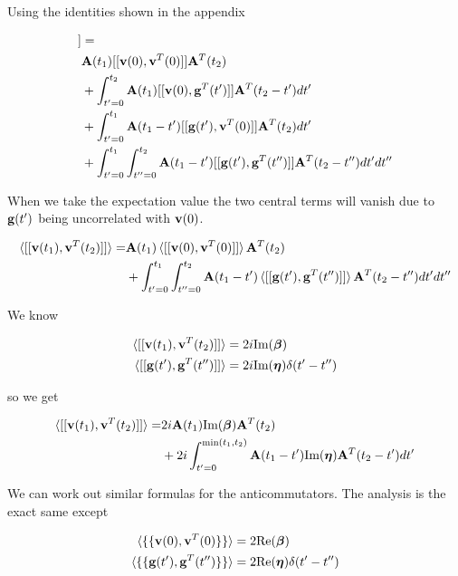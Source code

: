 \documentclass[12pt]{article}
\newcommand{\bv}[1]{\bold{#1}}
\newcommand{\bvs}[1]{\boldsymbol{#1}}
\begin{document}
Using the identities shown in the appendix

\begin{align}
[[\bv{v}(t_1),\bv{v}^T(t_2)]]&= \\
&\bv{A}(t_1)[[\bv{v}(0),\bv{v}^T(0)]]\bv{A}^T(t_2)\\
&+\int_{t'=0}^{t_2} \bv{A}(t_1) [[\bv{v}(0),\bv{g}^T(t')]] \bv{A}^T(t_2-t') dt'\\
&+\int_{t'=0}^{t_1}\bv{A}(t_1-t')[[\bv{g}(t'),\bv{v}^T(0)]] \bv{A}^T(t_2) dt'\\
&+\int_{t'=0}^{t_1}\int_{t''=0}^{t_2} \bv{A}(t_1-t')[[\bv{g}(t'),\bv{g}^T(t'')]]\bv{A}^T(t_2-t'') dt' dt''
\end{align}

When we take the expectation value the two central terms will vanish due to $\bv{g}(t')$ being uncorrelated with $\bv{v}(0)$.

\begin{align}
\braket{[[\bv{v}(t_1),\bv{v}^T(t_2)]]} =& \bv{A}(t_1)\braket{[[\bv{v}(0),\bv{v}^T(0)]]}\bv{A}^T(t_2)\\
&+\int_{t'=0}^{t_1}\int_{t''=0}^{t_2} \bv{A}(t_1-t')\braket{[[\bv{g}(t'),\bv{g}^T(t'')]]}\bv{A}^T(t_2-t'') dt' dt'' 
\end{align}

We know

\begin{align}
\braket{[[\bv{v}(t_1),\bv{v}^T(t_2)]]} &= 2i \text{Im}(\bvs{\beta})\\
\braket{[[\bv{g}(t'),\bv{g}^T(t'')]]} &= 2i \text{Im}(\bvs{\eta})\delta(t'-t'')
\end{align}

so we get

\begin{align}
\braket{[[\bv{v}(t_1),\bv{v}^T(t_2)]]} =& 2i \bv{A}(t_1) \text{Im}(\boldsymbol{\beta}) \bv{A}^T(t_2)\\
&+2i \int_{t'=0}^{\text{min}(t_1,t_2)} \bv{A}(t_1-t')\text{Im}(\boldsymbol{\eta})\bv{A}^T(t_2-t') dt'
\end{align}

We can work out similar formulas for the anticommutators. The analysis is the exact same except

\begin{align}
\braket{\{\{\bv{v}(0),\bv{v}^T(0)\}\}} &= 2 \text{Re}(\bvs{\beta})\\
\braket{\{\{\bv{g}(t'),\bv{g}^T(t'')\}\}} &= 2 \text{Re}(\bvs{\eta})\delta(t'-t'')
\end{align}
\end{document}
